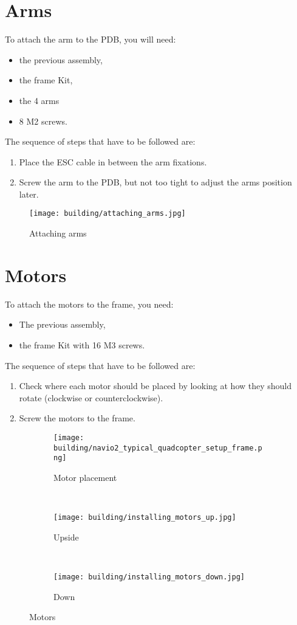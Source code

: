 \section{Arms}
To attach the arm to the PDB, you will need:
\begin{itemize}
    \item the previous assembly,
    \item the frame Kit,
    \item the 4 arms
    \item 8 M2 screws.
\end{itemize}
The sequence of steps that have to be followed are:
\begin{enumerate}
    \item Place the ESC cable in between the arm fixations.
    \item Screw the arm to the PDB, but not too tight to adjust the arms position later.
\end{enumerate}

\begin{figure}[!ht]
    \centering
    \texttt{[image: building/attaching\_arms.jpg]}
    \caption{Attaching arms}
    \label{fig:arms}
\end{figure}




\section{Motors}
To attach the motors to the frame, you need:
\begin{itemize}
    \item The previous assembly,
    \item the frame Kit with 16 M3 screws.
\end{itemize}
The sequence of steps that have to be followed are:
\begin{enumerate}
    \item Check where each motor should be placed by looking at how they should rotate (clockwise or counterclockwise).
    \item Screw the motors to the frame.
\end{enumerate}

\begin{figure}[!ht]
    \centering
    \begin{subfigure}[b]{0.3\textwidth}
        \texttt{[image: building/navio2\_typical\_quadcopter\_setup\_frame.png]}
        \caption{Motor placement}
        \label{fig:setup_frame}
    \end{subfigure}
    ~
    \begin{subfigure}[b]{0.3\textwidth}
        \texttt{[image: building/installing\_motors\_up.jpg]}
        \caption{Upside}
        \label{fig:motor_up}
    \end{subfigure}
    ~
    \begin{subfigure}[b]{0.3\textwidth}
        \texttt{[image: building/installing\_motors\_down.jpg]}
        \caption{Down}
        \label{fig:motor_down}
    \end{subfigure}
    \caption{Motors}\label{fig:Motors}
\end{figure}

